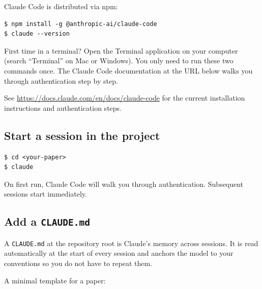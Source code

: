 Claude Code is distributed via npm:

\begin{lstlisting}[style=shell]
$ npm install -g @anthropic-ai/claude-code
$ claude --version
\end{lstlisting}

\begin{tipbox}{First time in a terminal?}
Open the Terminal application on your computer (search ``Terminal'' on Mac or Windows). You only need to run these two commands once. The Claude Code documentation at the URL below walks you through authentication step by step.
\end{tipbox}

\noindent See \url{https://docs.claude.com/en/docs/claude-code} for the current installation instructions and authentication steps.

\subsection{Start a session in the project}

\begin{lstlisting}[style=shell]
$ cd <your-paper>
$ claude
\end{lstlisting}

\noindent On first run, Claude Code will walk you through authentication. Subsequent sessions start immediately.

\subsection{Add a \texttt{CLAUDE.md}}

A \verb|CLAUDE.md| at the repository root is Claude's memory across sessions. It is read automatically at the start of every session and anchors the model to your conventions so you do not have to repeat them.

A minimal template for a paper:

